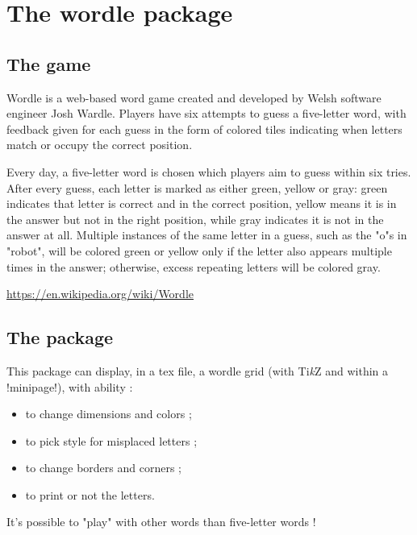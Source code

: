 \documentclass[english,a4paper,11pt]{article}
\providecommand\tikzlogo{Ti\textit{k}Z}
\let\TikZ\tikzlogo
\begin{document}
{\section{The wordle package}

\subsection{The game}

\begin{noteblock}
Wordle is a web-based word game created and developed by Welsh software engineer Josh Wardle. Players have six attempts to guess a five-letter word, with feedback given for each guess in the form of colored tiles indicating when letters match or occupy the correct position.

Every day, a five-letter word is chosen which players aim to guess within six tries. After every guess, each letter is marked as either green, yellow or gray: green indicates that letter is correct and in the correct position, yellow means it is in the answer but not in the right position, while gray indicates it is not in the answer at all. Multiple instances of the same letter in a guess, such as the "o"s in "robot", will be colored green or yellow only if the letter also appears multiple times in the answer; otherwise, excess repeating letters will be colored gray.

\smallskip

\hfill{\scriptsize \url{https://en.wikipedia.org/wiki/Wordle}}
\end{noteblock}

\subsection{The package}

\begin{noteblock}
This package can display, in a \textsf{tex} file, a wordle grid (with \TikZ{} and within a \motcletex!minipage!), with ability :

\begin{itemize}
	\item to change dimensions and colors ;
	\item to pick style for misplaced letters ;
	\item to change borders and corners ;
	\item to print or not the letters.
\end{itemize}

It's possible to "play" with other words than five-letter words !
\end{noteblock}

}
\end{document}
